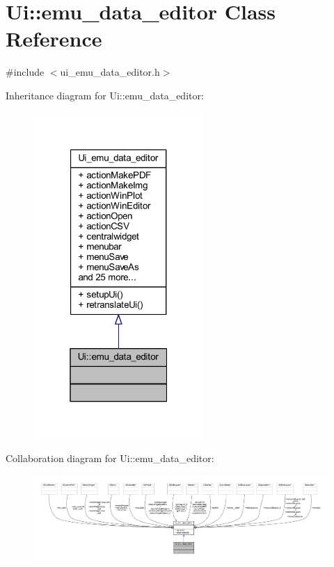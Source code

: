 \hypertarget{a00005}{\section{Ui\+:\+:emu\+\_\+data\+\_\+editor Class Reference}
\label{a00005}
}


{\ttfamily \#include $<$ui\+\_\+emu\+\_\+data\+\_\+editor.\+h$>$}



Inheritance diagram for Ui\+:\+:emu\+\_\+data\+\_\+editor\+:
\nopagebreak
\begin{figure}[H]
\begin{center}
\leavevmode
\includegraphics[width=184pt]{de/d55/a00323}
\end{center}
\end{figure}


Collaboration diagram for Ui\+:\+:emu\+\_\+data\+\_\+editor\+:
\nopagebreak
\begin{figure}[H]
\begin{center}
\leavevmode
\includegraphics[width=350pt]{d4/d8f/a00324}
\end{center}
\end{figure}
